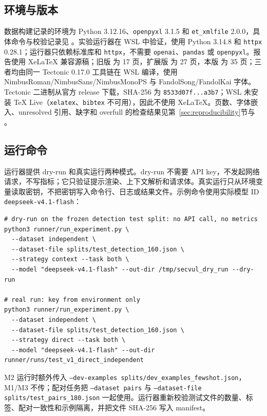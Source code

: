\documentclass[conference]{IEEEtran}
\begin{document}
\subsection{环境与版本}
数据构建记录的环境为 Python 3.12.16、\texttt{openpyxl} 3.1.5 和 \texttt{et\_xmlfile} 2.0.0，具体命令与校验记录见 。实验运行器在 WSL 中验证，使用 Python 3.14.8 和 \texttt{httpx} 0.28.1；运行器只依赖标准库和 \texttt{httpx}，不需要 \texttt{openai}、\texttt{pandas} 或 \texttt{openpyxl}。报告使用 XeLaTeX 兼容源稿；旧版  为 17 页，扩展版  为 27 页，本版  为 35 页；三者均由同一 Tectonic 0.17.0 工具链在 WSL 编译，使用 NimbusRoman/NimbusSans/NimbusMonoPS 与 FandolSong/FandolKai 字体。Tectonic 二进制从官方 release 下载，SHA-256 为 \texttt{8533d07f...a3b7}；WSL 未安装 TeX Live（\texttt{xelatex}、\texttt{bibtex} 不可用），因此不使用 XeLaTeX。页数、字体嵌入、unresolved 引用、缺字和 overfull 的检查结果见第~\ref{sec:reproducibility}节与 。

\subsection{运行命令}
运行器提供 dry-run 和真实运行两种模式。dry-run 不需要 API key，不发起网络请求，不写指标；它只验证提示渲染、上下文解析和请求体。真实运行只从环境变量读取密钥，不把密钥写入命令行、日志或结果文件。示例命令使用实际模型 ID \texttt{deepseek-v4.1-flash}：

\begin{lstlisting}
# dry-run on the frozen detection test split: no API call, no metrics
python3 runner/run_experiment.py \
  --dataset independent \
  --dataset-file splits/test_detection_160.json \
  --strategy context --task both \
  --model "deepseek-v4.1-flash" --out-dir /tmp/secvul_dry_run --dry-run

# real run: key from environment only
python3 runner/run_experiment.py \
  --dataset independent \
  --dataset-file splits/test_detection_160.json \
  --strategy direct --task both \
  --model "deepseek-v4.1-flash" --out-dir runner/runs/test_v1_direct_independent
\end{lstlisting}
M2 运行时额外传入 \texttt{--dev-examples splits/dev\_examples\_fewshot.json}，M1/M3 不传；配对任务把 \texttt{--dataset pairs} 与 \texttt{--dataset-file splits/test\_pairs\_180.json} 一起使用。运行器重新校验测试文件的数量、标签、配对一致性和示例隔离，并把文件 SHA-256 写入 manifest。
\end{document}
